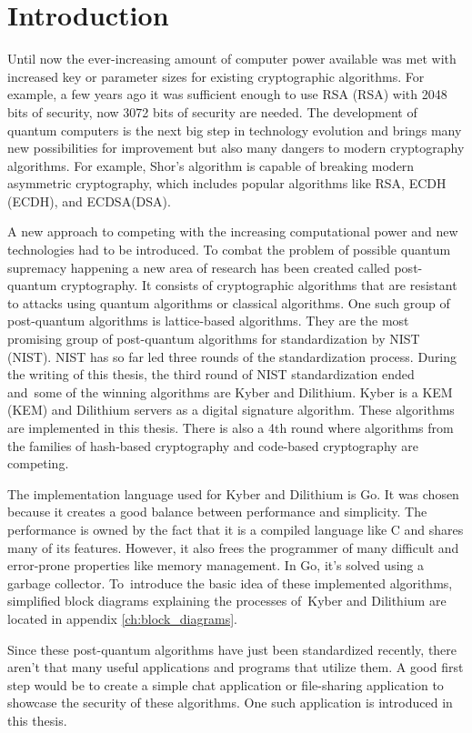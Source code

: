 \chapter*{Introduction}
{}

Until now the ever-increasing amount of computer power available was met with increased key or parameter sizes for existing cryptographic algorithms. For example, a few years ago it was sufficient enough to use RSA (\acl{RSA}) with 2048 bits of security, now 3072 bits of security are needed. The development of quantum computers is the next big step in technology evolution and brings many new possibilities for improvement but also many dangers to modern cryptography algorithms. For example, Shor's algorithm is capable of breaking modern asymmetric cryptography, which includes popular algorithms like RSA, ECDH (\acl{ECDH}), and ECDSA(\acl{DSA}).

A new approach to competing with the increasing computational power and new technologies had to be introduced. To combat the problem of possible quantum supremacy happening a new area of research has been created called post-quantum cryptography. It consists of cryptographic algorithms that are resistant to attacks using quantum algorithms or classical algorithms. One such group of post-quantum algorithms is lattice-based algorithms. They are the most promising group of post-quantum algorithms for standardization by NIST (\acl{NIST}). NIST has so far led three rounds of the standardization process. During the writing of this thesis, the third round of NIST standardization ended and~some of the winning algorithms are Kyber and Dilithium. Kyber is a KEM (\acl{KEM}) and Dilithium servers as a digital signature algorithm. These algorithms are implemented in this thesis. There is also a 4th round where algorithms from the families of hash-based cryptography and code-based cryptography are competing.

The implementation language used for Kyber and Dilithium is Go. It was chosen because it creates a good balance between performance and simplicity. The performance is owned by the fact that it is a compiled language like C and shares many of its features. However, it also frees the programmer of many difficult and error-prone properties like memory management. In Go, it's solved using a garbage collector. To~introduce the basic idea of these implemented algorithms, simplified block diagrams explaining the processes of~Kyber and Dilithium are located in appendix \ref{ch:block_diagrams}.

Since these post-quantum algorithms have just been standardized recently, there aren't that many useful applications and programs that utilize them. A good first step would be to create a simple chat application or file-sharing application to showcase the security of these algorithms. One such application is introduced in this thesis.
